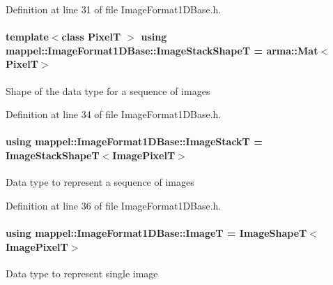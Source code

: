 Definition at line 31 of file Image\+Format1\+D\+Base.\+h.

\paragraph[{\texorpdfstring{Image\+Stack\+ShapeT}{ImageStackShapeT}}]{\setlength{\rightskip}{0pt plus 5cm}template$<$class PixelT $>$ using {\bf mappel\+::\+Image\+Format1\+D\+Base\+::\+Image\+Stack\+ShapeT} =  arma\+::\+Mat$<$PixelT$>$\hspace{0.3cm}{\ttfamily [inherited]}}\hypertarget{classmappel_1_1ImageFormat1DBase_ad9d4f0c3d04f3cecf3bf6b4709dcb4a8}{}\label{classmappel_1_1ImageFormat1DBase_ad9d4f0c3d04f3cecf3bf6b4709dcb4a8}
Shape of the data type for a sequence of images 

Definition at line 34 of file Image\+Format1\+D\+Base.\+h.

\paragraph[{\texorpdfstring{Image\+StackT}{ImageStackT}}]{\setlength{\rightskip}{0pt plus 5cm}using {\bf mappel\+::\+Image\+Format1\+D\+Base\+::\+Image\+StackT} =  {\bf Image\+Stack\+ShapeT}$<${\bf Image\+PixelT}$>$\hspace{0.3cm}{\ttfamily [inherited]}}\hypertarget{classmappel_1_1ImageFormat1DBase_a81e3246d1c5c37ebf9077b7b5bd25a76}{}\label{classmappel_1_1ImageFormat1DBase_a81e3246d1c5c37ebf9077b7b5bd25a76}
Data type to represent a sequence of images 

Definition at line 36 of file Image\+Format1\+D\+Base.\+h.

\paragraph[{\texorpdfstring{ImageT}{ImageT}}]{\setlength{\rightskip}{0pt plus 5cm}using {\bf mappel\+::\+Image\+Format1\+D\+Base\+::\+ImageT} =  {\bf Image\+ShapeT}$<${\bf Image\+PixelT}$>$\hspace{0.3cm}{\ttfamily [inherited]}}\hypertarget{classmappel_1_1ImageFormat1DBase_a521a1ff391a52a636fac4aac7c7ba02c}{}\label{classmappel_1_1ImageFormat1DBase_a521a1ff391a52a636fac4aac7c7ba02c}
Data type to represent single image 

